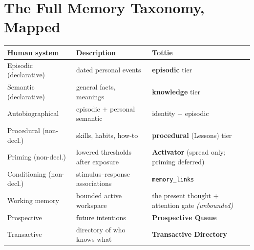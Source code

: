\section{The Full Memory Taxonomy, Mapped}
\begin{longtable}{@{}p{}p{}p{}@{}}
\toprule
Human system & Description & Tottie \\
\midrule
Episodic (declarative) & dated personal events & \textbf{episodic} tier \\
Semantic (declarative) & general facts, meanings & \textbf{knowledge} tier \\
Autobiographical & episodic $+$ personal semantic & identity $+$ episodic \\
Procedural (non-decl.) & skills, habits, how-to & \textbf{procedural} (Lessons) tier \\
Priming (non-decl.) & lowered thresholds after exposure & \textbf{Activator} (spread only; priming deferred) \\
Conditioning (non-decl.) & stimulus--response associations & \texttt{memory\_links} \\
Working memory & bounded active workspace & the present thought $+$ attention gate \emph{(unbounded)} \\
Prospective & future intentions & \textbf{Prospective Queue} \\
Transactive & directory of who knows what & \textbf{Transactive Directory} \\
\bottomrule
\end{longtable}

